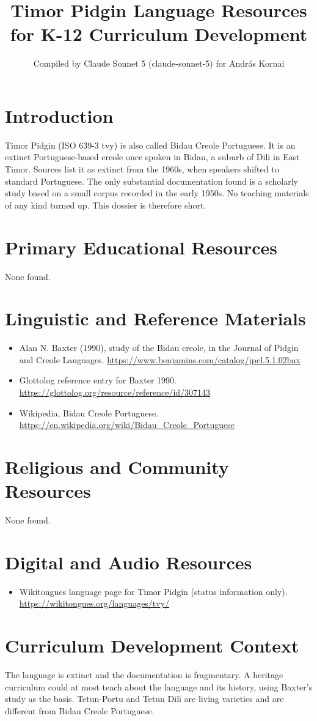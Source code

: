 \documentclass[12pt]{article}
\title{Timor Pidgin Language Resources for K-12 Curriculum Development}
\author{Compiled by Claude Sonnet 5 (claude-sonnet-5) for Andr\'as Kornai}
\date{}
\begin{document}
\maketitle

\section{Introduction}
Timor Pidgin (ISO 639-3 tvy) is also called Bidau Creole Portuguese. It is an extinct Portuguese-based creole once spoken in Bidau, a suburb of Dili in East Timor. Sources list it as extinct from the 1960s, when speakers shifted to standard Portuguese. The only substantial documentation found is a scholarly study based on a small corpus recorded in the early 1950s. No teaching materials of any kind turned up. This dossier is therefore short.

\section{Primary Educational Resources}
None found.

\section{Linguistic and Reference Materials}
\begin{itemize}
\item Alan N. Baxter (1990), study of the Bidau creole, in the Journal of Pidgin and Creole Languages. \url{https://www.benjamins.com/catalog/jpcl.5.1.02bax}
\item Glottolog reference entry for Baxter 1990. \url{https://glottolog.org/resource/reference/id/307143}
\item Wikipedia, Bidau Creole Portuguese. \url{https://en.wikipedia.org/wiki/Bidau_Creole_Portuguese}
\end{itemize}

\section{Religious and Community Resources}
None found.

\section{Digital and Audio Resources}
\begin{itemize}
\item Wikitongues language page for Timor Pidgin (status information only). \url{https://wikitongues.org/languages/tvy/}
\end{itemize}

\section{Curriculum Development Context}
The language is extinct and the documentation is fragmentary. A heritage curriculum could at most teach about the language and its history, using Baxter's study as the basis. Tetun-Portu and Tetun Dili are living varieties and are different from Bidau Creole Portuguese.
\end{document}
